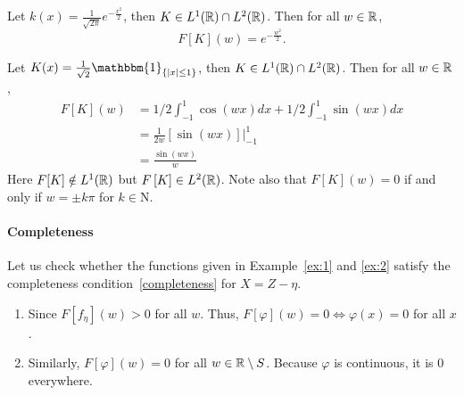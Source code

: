 \begin{example}
\label{ex:1}
    Let $k(x)=\frac{1}{\sqrt{2\pi}}e^{-\frac{x^2}{2}}$, then $K\in L^1(\mathbb{R})\cap L^2(\mathbb{R})$. Then for all $w\in \mathbb{R}$, $$F[K](w)=e^{-\frac{w^2}{2}}.$$
\end{example}
\begin{example}
\label{ex:2}
    Let $K(x)=\frac{1}{\sqrt{2}}\mathbbm{1}_{\{ \abs{x}\le 1\}}$, then $K\in L^1(\mathbb{R})\cap L^2(\mathbb{R})$. Then for all $w\in \mathbb{R}$,
    \begin{align*}
        F[K](w)&=1/2\int_{-1}^1 \cos(wx)dx+1/2\int_{-1}^1 \sin(wx)dx\\
        &=\frac{1}{2w}[\sin(wx)]\Big\vert_{-1}^1\\
        &=\frac{\sin(wx)}{w}
    \end{align*}
    Here $F[K]\notin L^1(\mathbb{R})$ but $F\left[K\right]\in L^2(\mathbb{R})$. Note also that $F[K](w)=0$ if and only if $w=\pm k\pi$ for $k\in \mathrm{N}$.
\end{example}

\paragraph{Completeness} Let us check whether the functions given in Example~\ref{ex:1} and \ref{ex:2} satisfy the completeness condition~\ref{completeness} for $X=Z-\eta$.  
\begin{enumerate}
    \item Since $F[f_\eta](w)>0$ for all $w$. Thus, $F[\varphi](w)=0\Leftrightarrow \varphi(x)=0$ for all $x$.
    \item Similarly,  $F[\varphi](w)=0$ for all $w\in \mathbb{R}\setminus S$. Because $\varphi$ is continuous, it is $0$ everywhere.
\end{enumerate}